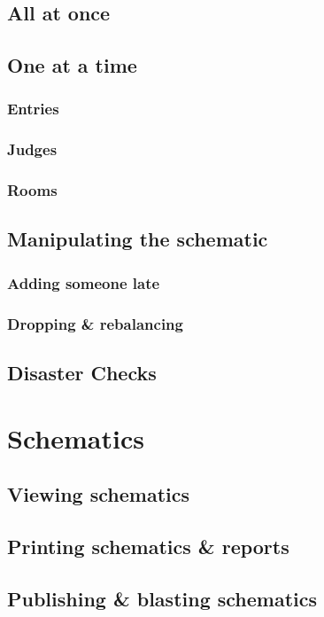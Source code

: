 \documentclass[12pt]{report}
\begin{document}
		\subsection{All at once}

		\subsection{One at a time}

		\subsubsection{Entries}
		\subsubsection{Judges}
		\subsubsection{Rooms}

		\subsection{Manipulating the schematic} 
		\subsubsection{Adding someone late}
		\subsubsection{Dropping \& rebalancing}

		\subsection{Disaster Checks}

	\section{Schematics}
		\subsection{Viewing schematics}
		\subsection{Printing schematics \& reports}
		\subsection{Publishing \& blasting schematics}
\end{document}
